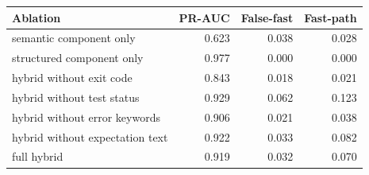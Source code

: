 \begin{tabular}{lrrr}
\toprule
Ablation & PR-AUC & False-fast & Fast-path \\
\midrule
semantic component only & 0.623 & 0.038 & 0.028 \\
structured component only & 0.977 & 0.000 & 0.000 \\
hybrid without exit code & 0.843 & 0.018 & 0.021 \\
hybrid without test status & 0.929 & 0.062 & 0.123 \\
hybrid without error keywords & 0.906 & 0.021 & 0.038 \\
hybrid without expectation text & 0.922 & 0.033 & 0.082 \\
full hybrid & 0.919 & 0.032 & 0.070 \\
\bottomrule
\end{tabular}
